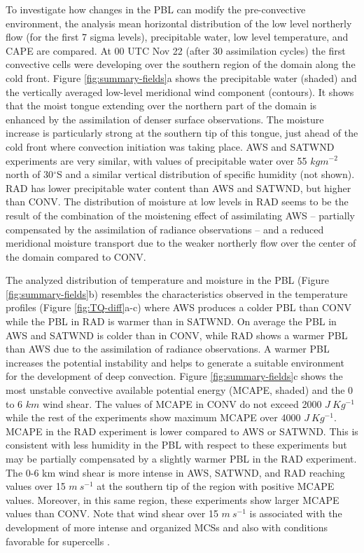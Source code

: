 \documentclass[preprint, 3p, authoryear,review, 12pt]{elsarticle} %
\begin{document}
To investigate how changes in the PBL can modify the pre-convective environment, the analysis mean horizontal distribution of the low level northerly flow (for the first 7 sigma levels), precipitable water, low level temperature, and CAPE are compared. At 00 UTC Nov 22 (after 30 assimilation cycles) the first convective cells were developing over the southern region of the domain along the cold front. Figure \ref{fig:summary-fields}a shows the precipitable water (shaded) and the vertically averaged low-level meridional wind component (contours). It shows that the moist tongue extending over the northern part of the domain is enhanced by the assimilation of denser surface observations. The moisture increase is particularly strong at the southern tip of this tongue, just ahead of the cold front where convection initiation was taking place. AWS and SATWND experiments are very similar, with values of precipitable water over 55 \(kgm^{-2}\) north of 30\(^{\circ}\)S and a similar vertical distribution of specific humidity (not shown). RAD has lower precipitable water content than AWS and SATWND, but higher than CONV. The distribution of moisture at low levels in RAD seems to be the result of the combination of the moistening effect of assimilating AWS -- partially compensated by the assimilation of radiance observations -- and a reduced meridional moisture transport due to the weaker northerly flow over the center of the domain compared to CONV.

The analyzed distribution of temperature and moisture in the PBL (Figure \ref{fig:summary-fields}b) resembles the characteristics observed in the temperature profiles (Figure \ref{fig:TQ-diff}a-c) where AWS produces a colder PBL than CONV while the PBL in RAD is warmer than in SATWND. On average the PBL in AWS and SATWND is colder than in CONV, while RAD shows a warmer PBL than AWS due to the assimilation of radiance observations. A warmer PBL increases the potential instability and helps to generate a suitable environment for the development of deep convection. Figure \ref{fig:summary-fields}c shows the most unstable convective available potential energy (MCAPE, shaded) and the 0 to 6 \(km\) wind shear. The values of MCAPE in CONV do not exceed 2000 \(J\ Kg^{-1}\) while the rest of the experiments show maximum MCAPE over 4000 \(J\ Kg^{-1}\). MCAPE in the RAD experiment is lower compared to AWS or SATWND. This is consistent with less humidity in the PBL with respect to these experiments but may be partially compensated by a slightly warmer PBL in the RAD experiment. The 0-6 km wind shear is more intense in AWS, SATWND, and RAD reaching values over 15 \(m\ s^{-1}\) at the southern tip of the region with positive MCAPE values. Moreover, in this same region, these experiments show larger MCAPE values than CONV. Note that wind shear over 15 \(m\ s^{-1}\) is associated with the development of more intense and organized MCSs \citep{chen2015} and also with conditions favorable for supercells \citep{markowski2010}.
\end{document}
